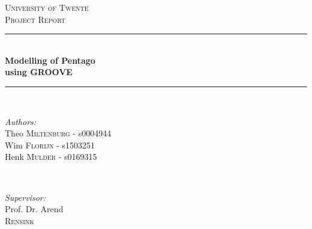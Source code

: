 \begin{titlepage}

\newcommand{\HRule}{\rule{\linewidth}{0.5mm}} %

\center %
 

\textsc{\LARGE University of Twente}\\[1.5cm] %
\textsc{\Large Project Report}\\[0.5cm] %


\HRule \\[0.4cm]
{ \huge \bfseries Modelling of Pentago}\\[0.4cm] %
\vspace{-1mm}
{ \huge \bfseries using GROOVE}\\[0.4cm] %
\HRule \\[1.5cm]
 

\begin{minipage}[t]{0.5\linewidth}
\begin{flushleft} \large
\emph{Authors:}\\
Theo \textsc{Miltenburg }  -  s0004944\\ %
Wim \textsc{Florijn}   - s1503251\\%
Henk \textsc{Mulder}   - s0169315%
\end{flushleft}
\end{minipage}
~
\begin{minipage}[t]{0.42\linewidth}
\begin{flushright} \large
\emph{Supervisor:} \\
Prof. Dr. Arend \\
\textsc{Rensink}%
\end{flushright}
\end{minipage}\\[2cm]


\end{titlepage}
